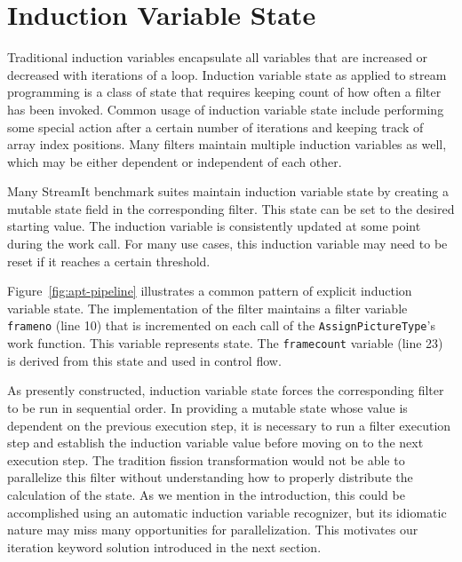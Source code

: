 \section{Induction Variable State}
\label{sec:inductionstate}

  





Traditional induction variables encapsulate all variables that are
increased or decreased with iterations of a loop.  Induction variable
state as applied to stream programming is a class of state that
requires keeping count of how often a filter has been invoked.  Common
usage of induction variable state include performing some special
action after a certain number of iterations and keeping track of array
index positions.  Many filters maintain multiple induction variables
as well, which may be either dependent or independent of each other.

Many StreamIt benchmark suites maintain induction variable state 
by creating a mutable state field in the corresponding filter.  This
state can be set to the desired starting value.  The induction
variable is consistently updated at some point during the work call.
For many use cases, this induction variable may need to be reset if it
reaches a certain threshold. 

Figure~\ref{fig:apt-pipeline} illustrates a common pattern of explicit
induction variable state.  The implementation of the filter maintains
a filter variable {\tt frameno} (line 10) that is incremented on each call of
the {\tt AssignPictureType}'s work function.  This variable
represents state.  The {\tt framecount} variable (line 23) is derived
from this state and used in control flow.

As presently constructed, induction variable state for\-ces the
corresponding filter to be run in sequential order.  In providing a
mutable state whose value is dependent on the previous execution step,
it is necessary to run a filter execution step and establish the
induction variable value before moving on to the next execution step.
The tradition fission transformation would not be able to parallelize
this filter without understanding how to properly distribute the
calculation of the state.  As we mention in the introduction, this
could be accomplished using an automatic induction variable
recognizer, but its idiomatic nature may miss many opportunities for
parallelization.  This motivates our iteration keyword solution
introduced in the next section.
